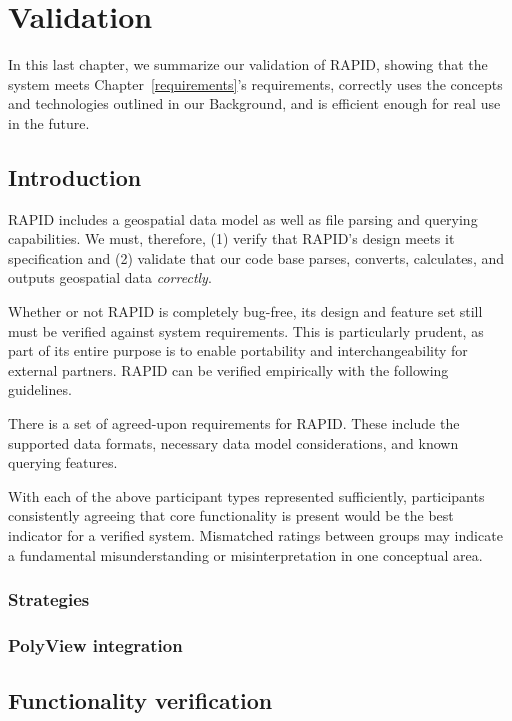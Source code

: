 \chapter{Validation}

In this last chapter, we summarize our validation of RAPID, showing that the system meets Chapter~\ref{requirements}'s requirements, correctly uses the concepts and technologies outlined in our Background, and is efficient enough for real use in the future.

\section{Introduction}
\label{polyview_details}

RAPID includes a geospatial data model as well as file parsing and querying capabilities. We must, therefore, (1) verify that RAPID's design meets it specification and (2) validate that our code base parses, converts, calculates, and outputs geospatial data \textit{correctly}.

Whether or not RAPID is completely bug-free, its design and feature set still must be verified against system requirements. This is particularly prudent, as part of its entire purpose is to enable portability and interchangeability for external partners. RAPID can be verified empirically with the following guidelines.

There is a set of agreed-upon requirements for RAPID. These include the supported data formats, necessary data model considerations, and known querying features.

With each of the above participant types represented sufficiently, participants consistently agreeing that core functionality is present would be the best indicator for a verified system. Mismatched ratings between groups may indicate a fundamental misunderstanding or misinterpretation in one conceptual area.

\subsection{Strategies}
\subsection{PolyView integration}


\section{Functionality verification}
